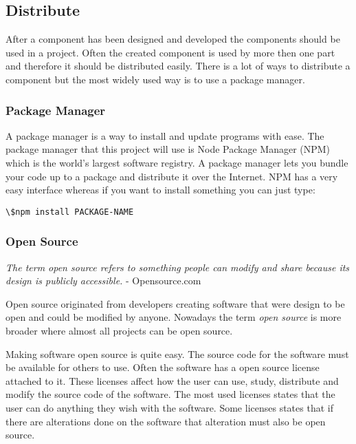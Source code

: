 \subsection{Distribute}%
\label{sub:Distribute}
After a component has been designed and developed the components should be used in a project. Often the created component is used by more then one part and therefore it should be distributed easily. There is a lot of ways to distribute a component but the most widely used way is to use a package manager.


\subsubsection{Package Manager}%
\label{sub:Package Manager}
\cite{PackageManager2020} 

A package manager is a way to install and update programs with ease. The package manager that this project will use is Node Package Manager (NPM) which is the world's largest software registry\cite{NpmNpmDocs}. A package manager lets you bundle your code up to a package and distribute it over the Internet. NPM has a very easy interface whereas if you want to install something you can just type: 

\begin{lstlisting}[style=htmlcssjs]
\$npm install PACKAGE-NAME
\end{lstlisting}

\subsubsection{Open Source}%
\label{ssub:Open Source}

\textit{The term open source refers to something people can modify and share because its design is publicly accessible.} - Opensource.com 

Open source originated from developers creating software that were design to be open and could be modified by anyone. Nowadays the term \textit{open source} is more broader where almost all projects can be open source. 

Making software open source is quite easy. The source code for the software must be available for others to use. Often the software has a open source license attached to it. These licenses affect how the user can use, study, distribute and modify the source code of the software. The most used licenses states that the user can do anything they wish with the software. Some licenses states that if there are alterations done on the software that alteration must also be open source.

